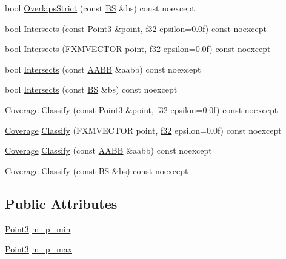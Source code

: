 \begin{DoxyCompactItemize}
\item 
bool \hyperlink{structmage_1_1_a_a_b_b_ac2f7270ec51acb91aed4965f135a53a9}{Overlaps\+Strict} (const \hyperlink{structmage_1_1_b_s}{BS} \&bs) const noexcept
\item 
bool \hyperlink{structmage_1_1_a_a_b_b_ab220b19adfd7723f0724ac9fb8ea2d36}{Intersects} (const \hyperlink{structmage_1_1_point3}{Point3} \&point, \hyperlink{namespacemage_a6a44ad388483959dc4dff9f2aef91431}{f32} epsilon=0.\+0f) const noexcept
\item 
bool \hyperlink{structmage_1_1_a_a_b_b_ae6598cf7645ea4482829b8df628fdcfd}{Intersects} (F\+X\+M\+V\+E\+C\+T\+OR point, \hyperlink{namespacemage_a6a44ad388483959dc4dff9f2aef91431}{f32} epsilon=0.\+0f) const noexcept
\item 
bool \hyperlink{structmage_1_1_a_a_b_b_a9c776b78b3125957bafc9ee99f7eedee}{Intersects} (const \hyperlink{structmage_1_1_a_a_b_b}{A\+A\+BB} \&aabb) const noexcept
\item 
bool \hyperlink{structmage_1_1_a_a_b_b_ac51fa4b4d3100d587c6a2d2b5513ad88}{Intersects} (const \hyperlink{structmage_1_1_b_s}{BS} \&bs) const noexcept
\item 
\hyperlink{namespacemage_aa9fe157e5a578a103160266df8cccb0a}{Coverage} \hyperlink{structmage_1_1_a_a_b_b_a0d51f70889675b4c943c1eabf4c41bb9}{Classify} (const \hyperlink{structmage_1_1_point3}{Point3} \&point, \hyperlink{namespacemage_a6a44ad388483959dc4dff9f2aef91431}{f32} epsilon=0.\+0f) const noexcept
\item 
\hyperlink{namespacemage_aa9fe157e5a578a103160266df8cccb0a}{Coverage} \hyperlink{structmage_1_1_a_a_b_b_a1602f7c634ee073a475353f21491959d}{Classify} (F\+X\+M\+V\+E\+C\+T\+OR point, \hyperlink{namespacemage_a6a44ad388483959dc4dff9f2aef91431}{f32} epsilon=0.\+0f) const noexcept
\item 
\hyperlink{namespacemage_aa9fe157e5a578a103160266df8cccb0a}{Coverage} \hyperlink{structmage_1_1_a_a_b_b_a835279b552703bd72fa19856ad27cbd7}{Classify} (const \hyperlink{structmage_1_1_a_a_b_b}{A\+A\+BB} \&aabb) const noexcept
\item 
\hyperlink{namespacemage_aa9fe157e5a578a103160266df8cccb0a}{Coverage} \hyperlink{structmage_1_1_a_a_b_b_a3092e0f6765695222f78bcfd78d67a6b}{Classify} (const \hyperlink{structmage_1_1_b_s}{BS} \&bs) const noexcept
\end{DoxyCompactItemize}
\subsection*{Public Attributes}
\begin{DoxyCompactItemize}
\item 
\hyperlink{structmage_1_1_point3}{Point3} \hyperlink{structmage_1_1_a_a_b_b_af5b7608aa0e332d70edfe0cb77bd27c2}{m\+\_\+p\+\_\+min}
\item 
\hyperlink{structmage_1_1_point3}{Point3} \hyperlink{structmage_1_1_a_a_b_b_a51643192d891301df8d8d3f24abd2a27}{m\+\_\+p\+\_\+max}
\end{DoxyCompactItemize}


